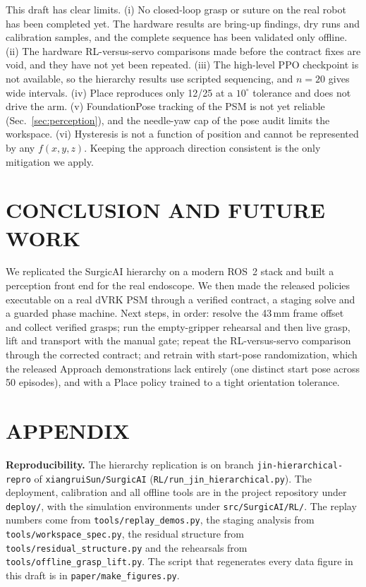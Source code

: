 \documentclass[letterpaper, 10 pt, conference]{ieeeconf}  %
\begin{document}
This draft has clear limits. (i) No closed-loop grasp or suture on the real
robot has been completed yet. The hardware results are bring-up findings, dry
runs and calibration samples, and the complete sequence has been validated only
offline. (ii) The hardware RL-versus-servo comparisons made before the contract
fixes are void, and they have not yet been repeated. (iii) The high-level PPO
checkpoint is not available, so the hierarchy results use scripted sequencing,
and $n{=}20$ gives wide intervals. (iv) Place reproduces only 12/25 at a
$10^\circ$ tolerance and does not drive the arm. (v) FoundationPose tracking of
the PSM is not yet reliable (Sec.~\ref{sec:perception}), and the needle-yaw cap
of the pose audit limits the workspace. (vi) Hysteresis is not a function of
position and cannot be represented by any $f(x,y,z)$. Keeping the approach
direction consistent is the only mitigation we apply.


\section{CONCLUSION AND FUTURE WORK}

We replicated the SurgicAI hierarchy on a modern ROS~2 stack and built a
perception front end for the real endoscope. We then made the released policies
executable on a real dVRK PSM through a verified contract, a staging solve and a
guarded phase machine. Next steps, in order: resolve the 43\,mm frame offset and
collect verified grasps; run the empty-gripper rehearsal and then live grasp,
lift and transport with the manual gate; repeat the RL-versus-servo comparison
through the corrected contract; and retrain with start-pose randomization,
which the released Approach demonstrations lack entirely (one distinct start
pose across 50 episodes), and with a Place policy trained to a tight
orientation tolerance.


\section*{APPENDIX}

\textbf{Reproducibility.} The hierarchy replication is on branch
\texttt{jin-hierarchical-repro} of \texttt{xiangruiSun/SurgicAI}
(\texttt{RL/run\_jin\_hierarchical.py}). The deployment, calibration and all
offline tools are in the project repository under \texttt{deploy/}, with the
simulation environments under \texttt{src/SurgicAI/RL/}. The replay numbers
come from \texttt{tools/replay\_demos.py}, the staging analysis from
\texttt{tools/workspace\_spec.py}, the residual structure from
\texttt{tools/residual\_structure.py} and the rehearsals from
\texttt{tools/offline\_grasp\_lift.py}. The script that regenerates every data
figure in this draft is in \texttt{paper/make\_figures.py}.
\end{document}
